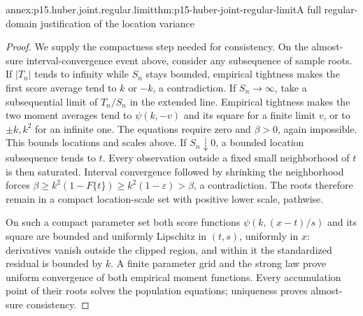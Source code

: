 \begin{annexitem}{annex:p15.huber.joint.regular.limit}{thm:p15-huber-joint-regular-limit}{A full regular-domain justification of the location variance}
\begin{proof}
We supply the compactness step needed for consistency.
On the almost-sure interval-convergence event above, consider
any subsequence of sample roots. If \(|T_n|\) tends to infinity
while \(S_n\) stays bounded, empirical tightness makes the first
score average tend to \(k\) or \(-k\), a contradiction.
If \(S_n\to\infty\), take a subsequential limit of \(T_n/S_n\)
in the extended line. Empirical tightness makes the two moment
averages tend to \(\psi(k,-v)\) and its square for a finite
limit \(v\), or to \(\pm k,k^2\) for an infinite one.
The equations require zero and \(\beta>0\), again impossible.
This bounds locations and scales above.
If \(S_n\downarrow0\), a bounded location subsequence tends to \(t\).
Every observation outside a fixed small neighborhood of \(t\)
is then saturated. Interval convergence followed by shrinking the
neighborhood forces
\(\beta\geq k^2(1-F\{t\})\geq k^2(1-\varepsilon)>\beta\),
a contradiction. The roots therefore remain in a compact
location-scale set with positive lower scale, pathwise.

On such a compact parameter set both score functions
\(\psi(k,(x-t)/s)\) and its square are bounded and uniformly
Lipschitz in \((t,s)\), uniformly in \(x\): derivatives vanish
outside the clipped region, and within it the standardized
residual is bounded by \(k\). A finite parameter grid and the
strong law prove uniform convergence of both empirical moment
functions. Every accumulation point of their roots solves the
population equations; uniqueness proves almost-sure consistency.


\end{proof}
\end{annexitem}
